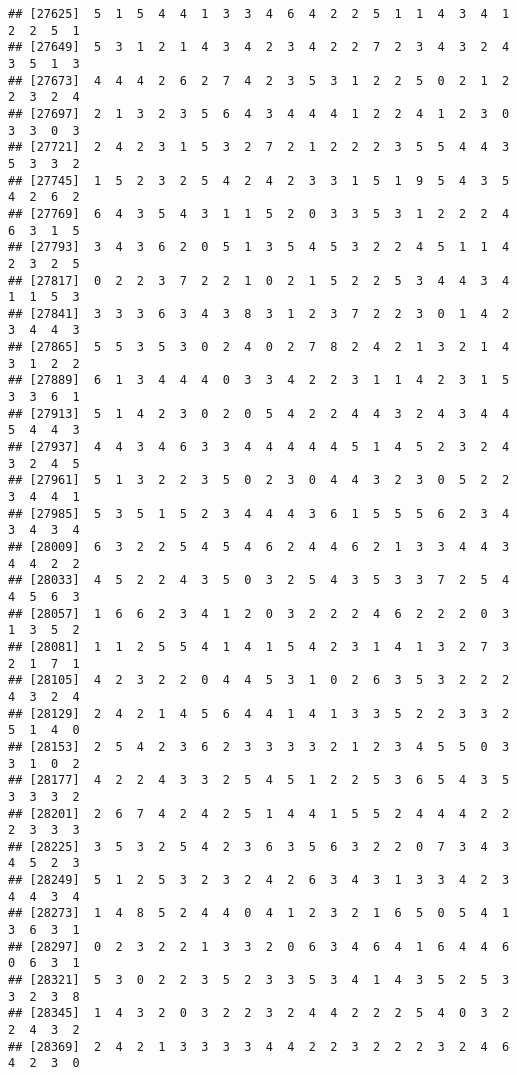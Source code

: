 \documentclass[
]{article}
\begin{document}
\begin{verbatim}
## [27625]  5  1  5  4  4  1  3  3  4  6  4  2  2  5  1  1  4  3  4  1  2  2  5  1
## [27649]  5  3  1  2  1  4  3  4  2  3  4  2  2  7  2  3  4  3  2  4  3  5  1  3
## [27673]  4  4  4  2  6  2  7  4  2  3  5  3  1  2  2  5  0  2  1  2  2  3  2  4
## [27697]  2  1  3  2  3  5  6  4  3  4  4  4  1  2  2  4  1  2  3  0  3  3  0  3
## [27721]  2  4  2  3  1  5  3  2  7  2  1  2  2  2  3  5  5  4  4  3  5  3  3  2
## [27745]  1  5  2  3  2  5  4  2  4  2  3  3  1  5  1  9  5  4  3  5  4  2  6  2
## [27769]  6  4  3  5  4  3  1  1  5  2  0  3  3  5  3  1  2  2  2  4  6  3  1  5
## [27793]  3  4  3  6  2  0  5  1  3  5  4  5  3  2  2  4  5  1  1  4  2  3  2  5
## [27817]  0  2  2  3  7  2  2  1  0  2  1  5  2  2  5  3  4  4  3  4  1  1  5  3
## [27841]  3  3  3  6  3  4  3  8  3  1  2  3  7  2  2  3  0  1  4  2  3  4  4  3
## [27865]  5  5  3  5  3  0  2  4  0  2  7  8  2  4  2  1  3  2  1  4  3  1  2  2
## [27889]  6  1  3  4  4  4  0  3  3  4  2  2  3  1  1  4  2  3  1  5  3  3  6  1
## [27913]  5  1  4  2  3  0  2  0  5  4  2  2  4  4  3  2  4  3  4  4  5  4  4  3
## [27937]  4  4  3  4  6  3  3  4  4  4  4  4  5  1  4  5  2  3  2  4  3  2  4  5
## [27961]  5  1  3  2  2  3  5  0  2  3  0  4  4  3  2  3  0  5  2  2  3  4  4  1
## [27985]  5  3  5  1  5  2  3  4  4  4  3  6  1  5  5  5  6  2  3  4  3  4  3  4
## [28009]  6  3  2  2  5  4  5  4  6  2  4  4  6  2  1  3  3  4  4  3  4  4  2  2
## [28033]  4  5  2  2  4  3  5  0  3  2  5  4  3  5  3  3  7  2  5  4  4  5  6  3
## [28057]  1  6  6  2  3  4  1  2  0  3  2  2  2  4  6  2  2  2  0  3  1  3  5  2
## [28081]  1  1  2  5  5  4  1  4  1  5  4  2  3  1  4  1  3  2  7  3  2  1  7  1
## [28105]  4  2  3  2  2  0  4  4  5  3  1  0  2  6  3  5  3  2  2  2  4  3  2  4
## [28129]  2  4  2  1  4  5  6  4  4  1  4  1  3  3  5  2  2  3  3  2  5  1  4  0
## [28153]  2  5  4  2  3  6  2  3  3  3  3  2  1  2  3  4  5  5  0  3  3  1  0  2
## [28177]  4  2  2  4  3  3  2  5  4  5  1  2  2  5  3  6  5  4  3  5  3  3  3  2
## [28201]  2  6  7  4  2  4  2  5  1  4  4  1  5  5  2  4  4  4  2  2  2  3  3  3
## [28225]  3  5  3  2  5  4  2  3  6  3  5  6  3  2  2  0  7  3  4  3  4  5  2  3
## [28249]  5  1  2  5  3  2  3  2  4  2  6  3  4  3  1  3  3  4  2  3  4  4  3  4
## [28273]  1  4  8  5  2  4  4  0  4  1  2  3  2  1  6  5  0  5  4  1  3  6  3  1
## [28297]  0  2  3  2  2  1  3  3  2  0  6  3  4  6  4  1  6  4  4  6  0  6  3  1
## [28321]  5  3  0  2  2  3  5  2  3  3  5  3  4  1  4  3  5  2  5  3  3  2  3  8
## [28345]  1  4  3  2  0  3  2  2  3  2  4  4  2  2  2  5  4  0  3  2  2  4  3  2
## [28369]  2  4  2  1  3  3  3  3  4  4  2  2  3  2  2  2  3  2  4  6  4  2  3  0

\end{verbatim}
\end{document}
